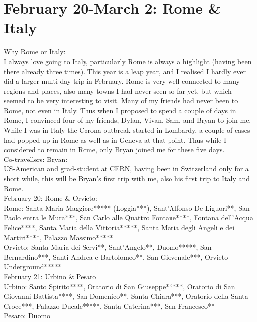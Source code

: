 \section{February 20-March 2: Rome \& Italy}
\label{2020:Rome}

Why Rome or Italy:\\
I always love going to Italy, particularly Rome is always a highlight (having been there already three times). This year is a leap year, and I realised I hardly ever did a larger multi-day trip in February. Rome is very well connected to many regions and places, also many towns I had never seen so far yet, but which seemed to be very interesting to visit. Many of my friends had never been to Rome, not even in Italy. Thus when I proposed to spend a couple of days in Rome, I convinced four of my friends, Dylan, Vivan, Sam, and Bryan to join me. While I was in Italy the Corona outbreak started in Lombardy, a couple of cases had popped up in Rome as well as in Geneva at that point. Thus while I considered to remain in Rome, only Bryan joined me for these five days. \\

Co-travellers: Bryan:\\
US-American and grad-student at CERN, having been in Switzerland only for a short while, this will be Bryan's first trip with me, also his first trip to Italy and Rome.\\

February 20: Rome \& Orvieto:\\%

Rome: Santa Maria Maggiore***** (Loggia***), Sant'Alfonso De Liguori**, San Paolo entra le Mura***, San Carlo alle Quattro Fontane****, Fontana dell'Acqua Felice****, Santa Maria della Vittoria*****, Santa Maria degli Angeli e dei Martiri****, Palazzo Massimo*****\\%
Orvieto: Santa Maria dei Servi**, Sant'Angelo**, Duomo*****, San Bernardino***, Santi Andrea e Bartolomeo**, San Giovenale***, Orvieto Underground*****\\%

February 21: Urbino \& Pesaro\\%

Urbino: Santo Spirito****, Oratorio di San Giuseppe*****, Oratorio di San Giovanni Battista****, San Domenico**, Santa Chiara***, Oratorio della Santa Croce***, Palazzo Ducale*****, Santa Caterina***, San Francesco**\\%
Pesaro: Duomo\\%

